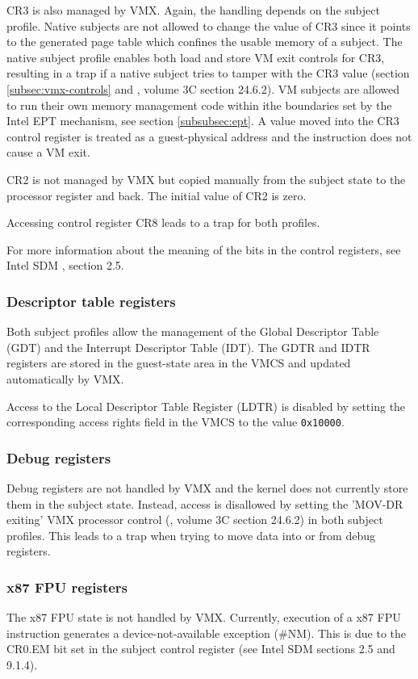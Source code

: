 CR3 is also managed by VMX. Again, the handling depends on the subject profile.
Native subjects are not allowed to change the value of CR3 since it points to
the generated page table which confines the usable memory of a subject. The
native subject profile enables both load and store VM exit controls for CR3,
resulting in a trap if a native subject tries to tamper with the CR3 value
(section \ref{subsec:vmx-controls} and \cite{IntelSDM}, volume 3C section
24.6.2). VM subjects are allowed to run their own memory management code within
ithe boundaries set by the Intel EPT mechanism, see section \ref{subsubsec:ept}.
A value moved into the CR3 control register is treated as a guest-physical address
and the instruction does not cause a VM exit.

CR2 is not managed by VMX but copied manually from the subject state to the
processor register and back. The initial value of CR2 is zero.

Accessing control register CR8 leads to a trap for both profiles.

For more information about the meaning of the bits in the control registers, see
Intel SDM \cite{IntelSDM}, section 2.5.

\subsubsection{Descriptor table registers}
Both subject profiles allow the management of the Global Descriptor Table
(GDT) and the Interrupt Descriptor Table (IDT). The GDTR
and IDTR registers are stored in the guest-state area in the VMCS and updated
automatically by VMX.

Access to the Local Descriptor Table Register (LDTR) is disabled by
setting the corresponding access rights field in the VMCS to the value
\texttt{0x10000}.

\subsubsection{Debug registers}
Debug registers are not handled by VMX and the kernel does not currently store
them in the subject state. Instead, access is disallowed by setting the 'MOV-DR
exiting' VMX processor control (\cite{IntelSDM}, volume 3C section 24.6.2) in
both subject profiles. This leads to a trap when trying to move data into or
from debug registers.

\subsubsection{x87 FPU registers}
The x87 FPU state is not handled by VMX. Currently, execution of a x87 FPU
instruction generates a device-not-available exception (\#NM). This is due to
the CR0.EM bit set in the subject control register (see Intel SDM sections 2.5
and 9.1.4).

